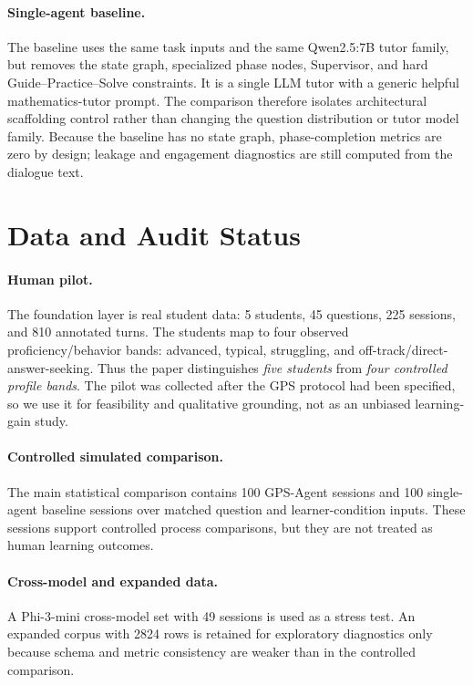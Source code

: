 \documentclass[11pt]{article}
\begin{document}
\paragraph{Single-agent baseline.} The baseline uses the same task inputs and the same Qwen2.5:7B tutor family, but removes the state graph, specialized phase nodes, Supervisor, and hard Guide--Practice--Solve constraints. It is a single LLM tutor with a generic helpful mathematics-tutor prompt. The comparison therefore isolates architectural scaffolding control rather than changing the question distribution or tutor model family. Because the baseline has no state graph, phase-completion metrics are zero by design; leakage and engagement diagnostics are still computed from the dialogue text.

\section{Data and Audit Status}
\paragraph{Human pilot.} The foundation layer is real student data: 5 students, 45 questions, 225 sessions, and 810 annotated turns. The students map to four observed proficiency/behavior bands: advanced, typical, struggling, and off-track/direct-answer-seeking. Thus the paper distinguishes \emph{five students} from \emph{four controlled profile bands}. The pilot was collected after the GPS protocol had been specified, so we use it for feasibility and qualitative grounding, not as an unbiased learning-gain study.

\paragraph{Controlled simulated comparison.} The main statistical comparison contains 100 GPS-Agent sessions and 100 single-agent baseline sessions over matched question and learner-condition inputs. These sessions support controlled process comparisons, but they are not treated as human learning outcomes.

\paragraph{Cross-model and expanded data.} A Phi-3-mini cross-model set with 49 sessions is used as a stress test. An expanded corpus with 2824 rows is retained for exploratory diagnostics only because schema and metric consistency are weaker than in the controlled comparison.
\end{document}
